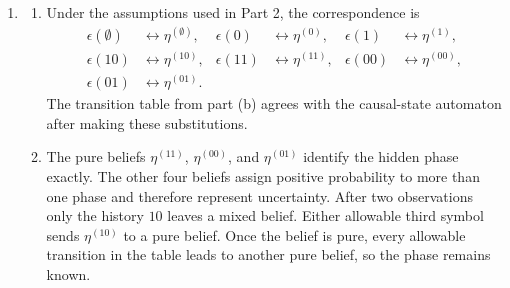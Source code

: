 \documentclass[11pt]{article}
\begin{document}
\begin{solution}[ex:p3-2]
\begin{enumerate}
        The allowable updates are
        \[
          \begin{array}{c|cc}
            \text{current belief} & 0 & 1\\
            \hline
            \eta^{(\emptyset)} & \eta^{(0)} & \eta^{(1)}\\
            \eta^{(0)}         & \eta^{(00)} & \eta^{(01)}\\
            \eta^{(1)}         & \eta^{(10)} & \eta^{(11)}\\
            \eta^{(10)}        & \eta^{(00)} & \eta^{(01)}\\
            \eta^{(11)}        & \eta^{(00)} & \text{impossible}\\
            \eta^{(00)}        & \text{impossible} & \eta^{(01)}\\
            \eta^{(01)}        & \eta^{(11)} & \eta^{(11)}
          \end{array}
        \]
        This table specifies the requested symbol-labelled diagram and shows
        that every allowable update stays in $\mathcal B$.

      \item
        \begin{enumerate}
          \item Under the assumptions used in Part 2, the correspondence is
            \[
              \begin{aligned}
                \epsilon(\emptyset)&\longleftrightarrow\eta^{(\emptyset)},&
                \epsilon(0)&\longleftrightarrow\eta^{(0)},&
                \epsilon(1)&\longleftrightarrow\eta^{(1)},\\
                \epsilon(10)&\longleftrightarrow\eta^{(10)},&
                \epsilon(11)&\longleftrightarrow\eta^{(11)},&
                \epsilon(00)&\longleftrightarrow\eta^{(00)},\\
                \epsilon(01)&\longleftrightarrow\eta^{(01)}.
              \end{aligned}
            \]
            The transition table from part (b) agrees with the causal-state
            automaton after making these substitutions.

          \item The pure beliefs $\eta^{(11)}$, $\eta^{(00)}$, and
            $\eta^{(01)}$ identify the hidden phase exactly. The other four
            beliefs assign positive probability to more than one phase and
            therefore represent uncertainty.
            After two observations only the history $10$ leaves a mixed
            belief. Either allowable third symbol sends $\eta^{(10)}$ to a
            pure belief. Once the belief is pure, every allowable transition
            in the table leads to another pure belief, so the phase remains
            known.


\end{enumerate}
\end{enumerate}
\end{solution}
\end{document}
